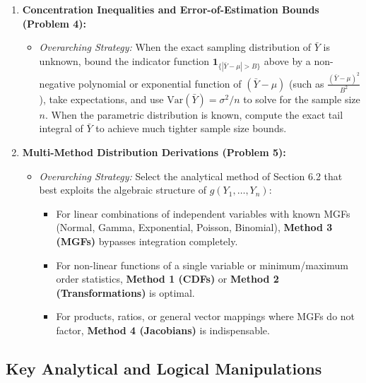 \documentclass[11pt, letterpaper]{article}
\theoremstyle{definition}
\theoremstyle{remark}
\begin{document}
\begin{enumerate}[label=\textbf{\arabic*.}]
    \item \textbf{Concentration Inequalities and Error-of-Estimation Bounds (Problem 4):}
    \begin{itemize}
        \item \emph{Overarching Strategy:} When the exact sampling distribution of $\bar{Y}$ is unknown, bound the indicator function $\mathbf{1}_{\{|\bar{Y}-\mu| > B\}}$ above by a non-negative polynomial or exponential function of $(\bar{Y}-\mu)$ (such as $\frac{(\bar{Y}-\mu)^2}{B^2}$), take expectations, and use $\text{Var}(\bar{Y}) = \sigma^2/n$ to solve for the sample size $n$. When the parametric distribution is known, compute the exact tail integral of $\bar{Y}$ to achieve much tighter sample size bounds.
    \end{itemize}

    \item \textbf{Multi-Method Distribution Derivations (Problem 5):}
    \begin{itemize}
        \item \emph{Overarching Strategy:} Select the analytical method of Section 6.2 that best exploits the algebraic structure of $g(Y_1, \dots, Y_n)$:
        \begin{itemize}
            \item For linear combinations of independent variables with known MGFs (Normal, Gamma, Exponential, Poisson, Binomial), \textbf{Method 3 (MGFs)} bypasses integration completely.
            \item For non-linear functions of a single variable or minimum/maximum order statistics, \textbf{Method 1 (CDFs)} or \textbf{Method 2 (Transformations)} is optimal.
            \item For products, ratios, or general vector mappings where MGFs do not factor, \textbf{Method 4 (Jacobians)} is indispensable.
        \end{itemize}
    \end{itemize}
\end{enumerate}

\subsection{Key Analytical and Logical Manipulations}
\end{document}
